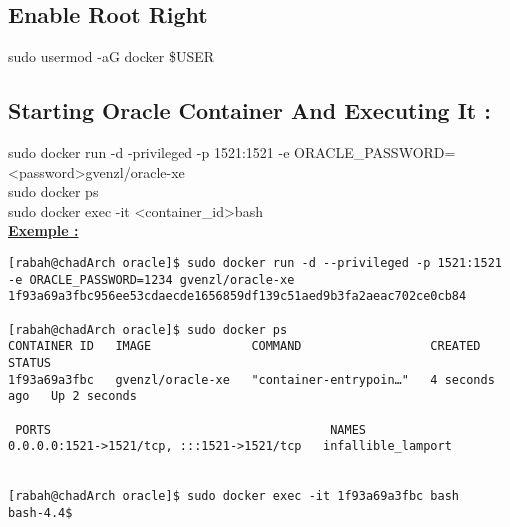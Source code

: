 \documentclass{article}
\begin{document}
\subsection{Enable Root Right}
\begin{tcolorbox}

   sudo usermod -aG docker \$USER\\
 
    
   
\end{tcolorbox}
\subsection{Starting Oracle Container And Executing It :}
\begin{tcolorbox}
    sudo docker run -d -privileged -p 1521:1521 -e ORACLE\_PASSWORD=\textless password\textgreater gvenzl/oracle-xe\\
    sudo docker ps\\
    sudo docker exec -it \textless container\_id\textgreater bash\\

    \textbf{\underline{Exemple :}}\\

\begin{verbatim}
[rabah@chadArch oracle]$ sudo docker run -d --privileged -p 1521:1521 -e ORACLE_PASSWORD=1234 gvenzl/oracle-xe
1f93a69a3fbc956ee53cdaecde1656859df139c51aed9b3fa2aeac702ce0cb84

[rabah@chadArch oracle]$ sudo docker ps
CONTAINER ID   IMAGE              COMMAND                  CREATED         STATUS         
1f93a69a3fbc   gvenzl/oracle-xe   "container-entrypoin…"   4 seconds ago   Up 2 seconds 

 PORTS                                       NAMES
0.0.0.0:1521->1521/tcp, :::1521->1521/tcp   infallible_lamport


[rabah@chadArch oracle]$ sudo docker exec -it 1f93a69a3fbc bash
bash-4.4$
\end{verbatim}
\end{tcolorbox}
\end{document}
